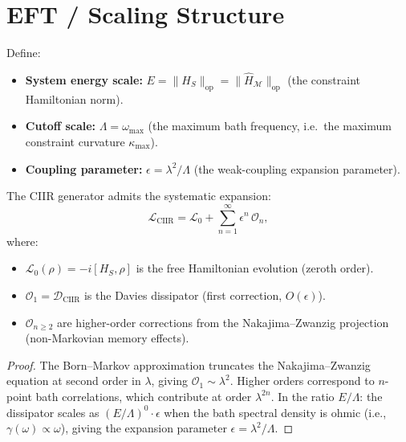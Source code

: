 \section{EFT / Scaling Structure}
\label{sec:c9:eft}

\begin{definition}
\label{def:c9:scales}
Define:
\begin{itemize}
\item \textbf{System energy scale:}
  $E = \|H_S\|_{\mathrm{op}} = \|\hat{H}_{\mathcal{M}}\|_{\mathrm{op}}$
  (the constraint Hamiltonian norm).
\item \textbf{Cutoff scale:}
  $\Lambda = \omega_{\max}$ (the maximum bath frequency, i.e.\ the
  maximum constraint curvature $\kappa_{\max}$).
\item \textbf{Coupling parameter:}
  $\epsilon = \lambda^2 / \Lambda$ (the weak-coupling expansion parameter).
\end{itemize}
\end{definition}

\begin{theorem}
\label{thm:c9:eft}
The CIIR generator admits the systematic expansion:
\begin{equation}
  \mathcal{L}_{\mathrm{CIIR}} = \mathcal{L}_0
    + \sum_{n=1}^{\infty} \epsilon^n\, \mathcal{O}_n,
  \label{eq:c9:eft_expansion}
\end{equation}
where:
\begin{itemize}
\item $\mathcal{L}_0(\rho) = -i[H_S, \rho]$ is the free Hamiltonian
  evolution (zeroth order).
\item $\mathcal{O}_1 = \mathcal{D}_{\mathrm{CIIR}}$ is the Davies
  dissipator (first correction, $O(\epsilon)$).
\item $\mathcal{O}_{n \geq 2}$ are higher-order corrections from the
  Nakajima--Zwanzig projection (non-Markovian memory effects).
\end{itemize}
\end{theorem}

\begin{proof}
The Born--Markov approximation truncates the Nakajima--Zwanzig equation
at second order in $\lambda$, giving $\mathcal{O}_1 \sim \lambda^2$.
Higher orders correspond to $n$-point bath correlations, which contribute
at order $\lambda^{2n}$.  In the ratio $E/\Lambda$:  the dissipator
scales as $(E/\Lambda)^0 \cdot \epsilon$ when the bath spectral density
is ohmic (i.e., $\gamma(\omega) \propto \omega$), giving the expansion
parameter $\epsilon = \lambda^2/\Lambda$.
\end{proof}

